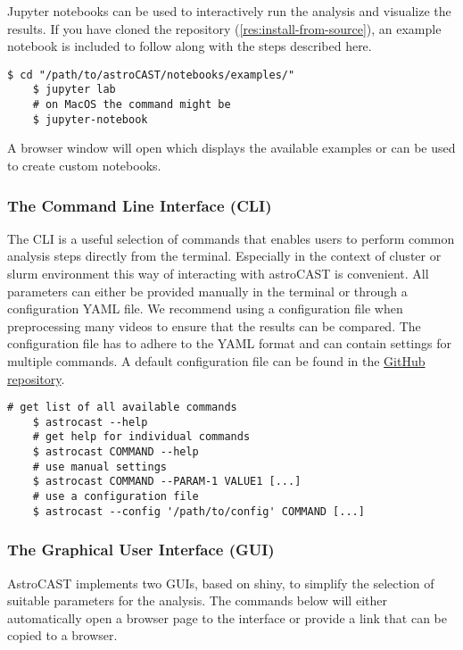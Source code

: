 Jupyter notebooks can be used to interactively run the analysis and visualize the results.
If you have cloned the repository (\ref{res:install-from-source}), an example notebook is included to follow along with the steps described here.

\begin{lstlisting}[style=bashStyle]
    $ cd "/path/to/astroCAST/notebooks/examples/"
    $ jupyter lab
    # on MacOS the command might be
    $ jupyter-notebook
\end{lstlisting}

A browser window will open which displays the available examples or can be used to create custom notebooks.

\subsubsection{The Command Line Interface (CLI)}

The \ac{CLI} is a useful selection of commands that enables users to perform common analysis steps directly from the terminal. Especially in the context of cluster or slurm environment this way of interacting with astroCAST is convenient. All parameters can either be provided manually in the terminal or through a configuration YAML file. We recommend using a configuration file when preprocessing many videos to ensure that the results can be compared. The configuration file has to adhere to the YAML format and can contain settings for multiple commands. A default configuration file can be found in the \href{https://github.com/janreising/astroCAST/blob/3ad41d03068732419df7fdde9b2a0f449898d4e2/config.yaml}{GitHub repository}.

\begin{lstlisting}[style=bashStyle]
    # get list of all available commands
    $ astrocast --help
    # get help for individual commands
    $ astrocast COMMAND --help
    # use manual settings
    $ astrocast COMMAND --PARAM-1 VALUE1 [...]
    # use a configuration file
    $ astrocast --config '/path/to/config' COMMAND [...]
\end{lstlisting}

\subsubsection{The Graphical User Interface (GUI)}

AstroCAST implements two \ac{GUI}s, based on shiny\citep{chang_shiny_2024}, to simplify the selection of suitable parameters for the analysis. The commands below will either automatically open a browser page to the interface or provide a link that can be copied to a browser.


